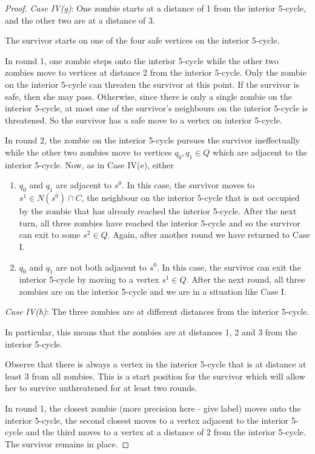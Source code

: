 \begin{proof}
\textit{Case IV(g)}: One zombie starts at a distance of 1 from the interior 5-cycle, and the other two are at a distance of 3.

The survivor starts on one of the four safe vertices on the interior 5-cycle.

In round 1, one zombie steps onto the interior 5-cycle while the other two zombies move to vertices at distance 2 from the interior 5-cycle.
Only the zombie on the interior 5-cycle can threaten the survivor at this point. If the survivor is safe, then she may pass. Otherwise, since there is
only a single zombie on the interior 5-cycle, at most one of the survivor's neighbours on the interior 5-cycle is threatened.
So the survivor has a safe move to a vertex on interior 5-cycle.

In round 2, the zombie on the interior 5-cycle pursues the survivor ineffectually while the other two zombies move to vertices $q_0, q_1 \in Q$ which are
adjacent to the interior 5-cycle. Now, as in Case IV(e), either

\begin{enumerate}
\item $q_0$ and $q_1$ are adjacent to $s^0$. In this case, the survivor moves to $s^1 \in N(s^0) \cap C$, the neighbour on the interior 5-cycle that is not occupied
by the zombie that has already reached the interior 5-cycle. After the next turn, all three zombies have reached the interior 5-cycle and so the survivor can
exit to some $s^2 \in Q$. Again, after another round we have returned to Case I.

\item $q_0$ and $q_1$ are not both adjacent to $s^0$. In this case, the survivor can exit the interior 5-cycle by moving to a vertex $s^1 \in Q$. After the next
round, all three zombies are on the interior 5-cycle and we are in a situation like Case I.
\end{enumerate}


\textit{Case IV(h)}: The three zombies are at different distances from the interior 5-cycle.

In particular, this means that the zombies are at distances 1, 2 and 3 from the interior 5-cycle.

Observe that there is always a vertex in the interior 5-cycle that is at distance at least 3 from all zombies. This is a start position for the survivor which
will allow her to survive unthreatened for at least two rounds.

In round 1, the closest zombie (more precision here - give label) moves onto the interior 5-cycle, the second closest moves to a vertex adjacent to the interior 5-cycle and the third
moves to a vertex at a distance of 2 from the interior 5-cycle. The survivor remains in place.


\end{proof}
